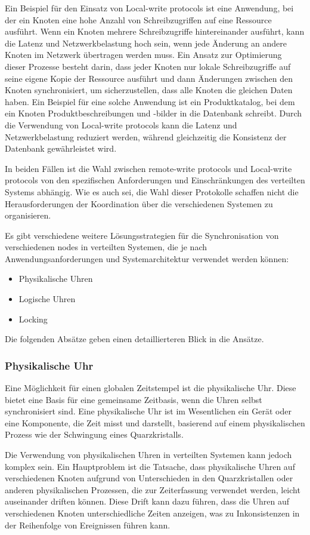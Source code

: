 Ein Beispiel für den Einsatz von Local-write protocols ist eine Anwendung, bei der ein Knoten eine hohe Anzahl von Schreibzugriffen auf eine Ressource ausführt. Wenn ein Knoten mehrere Schreibzugriffe hintereinander ausführt, kann die Latenz und Netzwerkbelastung hoch sein, wenn jede Änderung an andere Knoten im Netzwerk übertragen werden muss. Ein Ansatz zur Optimierung dieser Prozesse besteht darin, dass jeder Knoten nur lokale Schreibzugriffe auf seine eigene Kopie der Ressource ausführt und dann Änderungen zwischen den Knoten synchronisiert, um sicherzustellen, dass alle Knoten die gleichen Daten haben. Ein Beispiel für eine solche Anwendung ist ein Produktkatalog, bei dem ein Knoten Produktbeschreibungen und -bilder in die Datenbank schreibt. Durch die Verwendung von Local-write protocols kann die Latenz und Netzwerkbelastung reduziert werden, während gleichzeitig die Konsistenz der Datenbank gewährleistet wird.

In beiden Fällen ist die Wahl zwischen remote-write protocols und Local-write protocols von den spezifischen Anforderungen und Einschränkungen des verteilten Systems abhängig. Wie es auch sei, die Wahl dieser Protokolle schaffen nicht die Herausforderungen der Koordination über die verschiedenen Systemen zu organisieren. 

Es gibt verschiedene weitere Lösungsstrategien für die Synchronisation von verschiedenen nodes in verteilten Systemen, die je nach Anwendungsanforderungen und Systemarchitektur verwendet werden können:
\begin{itemize}
\item Physikalische Uhren
\item Logische Uhren
\item Locking
\end{itemize}
Die folgenden Absätze geben einen detaillierteren Blick in die Ansätze. 

\subsubsection{Physikalische Uhr}

Eine Möglichkeit für einen globalen Zeitstempel ist die physikalische Uhr. Diese bietet eine Basis für eine gemeinsame Zeitbasis, wenn die Uhren selbst synchronisiert sind. Eine physikalische Uhr ist im Wesentlichen ein Gerät oder eine Komponente, die Zeit misst und darstellt, basierend auf einem physikalischen Prozess wie der Schwingung eines Quarzkristalls.

Die Verwendung von physikalischen Uhren in verteilten Systemen kann jedoch komplex sein. Ein Hauptproblem ist die Tatsache, dass physikalische Uhren auf verschiedenen Knoten aufgrund von Unterschieden in den Quarzkristallen oder anderen physikalischen Prozessen, die zur Zeiterfassung verwendet werden, leicht auseinander driften können. Diese Drift kann dazu führen, dass die Uhren auf verschiedenen Knoten unterschiedliche Zeiten anzeigen, was zu Inkonsistenzen in der Reihenfolge von Ereignissen führen kann.

